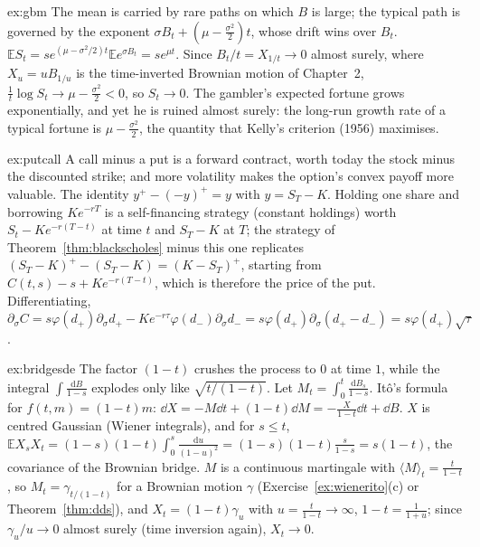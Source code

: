 \begin{solution}{ex:gbm}
\idea The mean is carried by rare paths on which $B$ is large; the typical path is governed by the exponent $\sigma B_t+(\mu-\frac{\sigma^2}2)t$, whose drift wins over $B_t$.
\writeup $\mathbb ES_t=se^{(\mu-\sigma^2/2)t}\mathbb Ee^{\sigma B_t}=se^{\mu t}$. Since $B_t/t=X_{1/t}\to0$ almost surely, where $X_u=uB_{1/u}$ is the time-inverted Brownian motion of Chapter~2,
$\frac1t\log S_t\to\mu-\frac{\sigma^2}2<0$, so $S_t\to0$. The gambler's expected fortune grows exponentially, and yet he is ruined almost surely: the long-run growth rate of a typical fortune is
$\mu-\frac{\sigma^2}2$, the quantity that Kelly's criterion (1956) maximises.
\end{solution}

\begin{solution}{ex:putcall}
\idea A call minus a put is a forward contract, worth today the stock minus the discounted strike; and more volatility makes the option's convex payoff more valuable.
\writeup The identity $y^+-(-y)^+=y$ with $y=S_T-K$. Holding one share and borrowing $Ke^{-rT}$ is a self-financing strategy (constant holdings) worth $S_t-Ke^{-r(T-t)}$ at time $t$ and $S_T-K$ at $T$; the strategy of
Theorem~\ref{thm:blackscholes} minus this one replicates $(S_T-K)^+-(S_T-K)=(K-S_T)^+$, starting from $C(t,s)-s+Ke^{-r(T-t)}$, which is therefore the price of the put. Differentiating, $\partial_\sigma C=s\varphi(d_+)\partial_\sigma d_+-Ke^{-r\tau}\varphi(d_-)\partial_\sigma d_-
=s\varphi(d_+)\partial_\sigma(d_+-d_-)=s\varphi(d_+)\sqrt\tau$.
\end{solution}

\begin{solution}{ex:bridgesde}
\idea The factor $(1-t)$ crushes the process to $0$ at time $1$, while the integral $\int\frac{\mathrm dB}{1-s}$ explodes only like $\sqrt{t/(1-t)}$.
\writeup Let $M_t=\int_0^t\frac{\mathrm dB_s}{1-s}$. It\^o's formula for $f(t,m)=(1-t)m$: $\dd X=-M\dd t+(1-t)\dd M=-\frac X{1-t}\dd t+\dd B$. $X$ is centred Gaussian (Wiener integrals), and for $s\le t$,
$\mathbb EX_sX_t=(1-s)(1-t)\int_0^s\frac{\mathrm du}{(1-u)^2}=(1-s)(1-t)\frac s{1-s}=s(1-t)$, the covariance of the Brownian bridge. $M$ is a continuous martingale with $\langle M\rangle_t=\frac t{1-t}$, so
$M_t=\gamma_{t/(1-t)}$ for a Brownian motion $\gamma$ (Exercise~\ref{ex:wienerito}(c) or Theorem~\ref{thm:dds}), and $X_t=(1-t)\gamma_{u}$ with $u=\frac t{1-t}\to\infty$, $1-t=\frac1{1+u}$; since $\gamma_u/u\to0$
almost surely (time inversion again), $X_t\to0$.
\end{solution}

